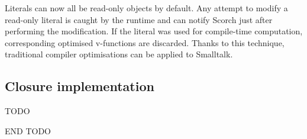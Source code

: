 \documentclass[a4paper,12pt,twoside]{../includes/ThesisStyle}
\begin{document}
Literals can now all be read-only objects by default. Any attempt to modify a read-only literal is caught by the runtime and can notify Scorch just after performing the modification. If the literal was used for compile-time computation, corresponding optimised v-functions are discarded. Thanks to this technique, traditional compiler optimisations can be applied to Smalltalk.

\subsection{Closure implementation}

TODO



END TODO


\ifx\wholebook\relax\else
    
\end{document}
